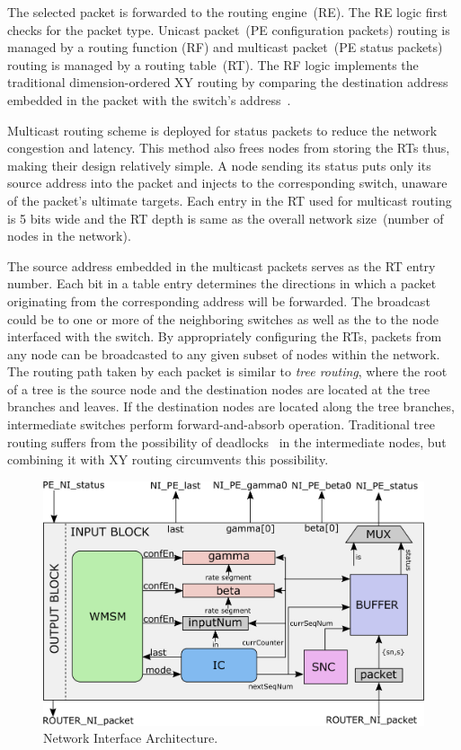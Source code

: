 The selected packet is forwarded to the routing engine~(RE).
The RE logic first checks for the packet type.
Unicast packet~(PE configuration packets) routing is managed by a routing function (RF) and multicast packet~(PE status packets) routing is managed by a routing table~(RT).
The RF logic implements the traditional dimension-ordered XY routing by comparing the destination address embedded in the packet with the switch's address~\cite{Chawade2012}.

Multicast routing scheme is deployed for status packets to reduce the network congestion and latency.
This method also frees nodes from storing the RTs thus, making their design relatively simple.
A node sending its status puts only its source address into the packet and injects to the corresponding switch, unaware of the packet's ultimate targets.
Each entry in the RT used for multicast routing is 5 bits wide and the RT depth is same as the overall network size~(number of nodes in the network).

The source address embedded in the multicast packets serves as the RT entry number.
Each bit in a table entry determines the directions in which a packet originating from the corresponding address will be forwarded.
The broadcast could be to one or more of the neighboring switches as well as the to the node interfaced with the switch.
By appropriately configuring the RTs, packets from any node can be broadcasted to any given subset of nodes within the network. 
The routing path taken by each packet is similar to \emph{tree routing}, where the root of a tree is the source node and the destination nodes are located at the tree branches and leaves. 
If the destination nodes are located along the tree branches, intermediate switches perform forward-and-absorb operation. 
Traditional tree routing suffers from the possibility of deadlocks~\cite{Samman2010} in the intermediate nodes, but combining it with XY routing circumvents this possibility. 

\begin{figure}[t!]
    \begin{center}
    \includegraphics[width=0.8\columnwidth]{Figures/NI.pdf}
    \caption{Network Interface Architecture.} 
    \label{figure:ni}
    \vspace{-5mm}
    \end{center}
\end{figure}

